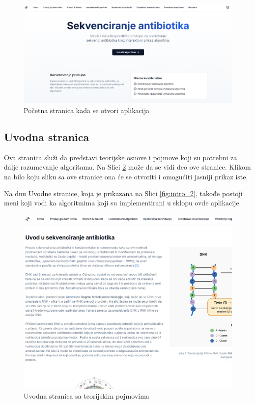 \documentclass[12pt,oneside]{memoir}
\begin{document}
\begin{figure}[H]
\centering
\includegraphics[width=1\textwidth]{images/landing_page.png}
\caption{Početna stranica kada se otvori aplikacija}
\label{fig:landing_page}
\end{figure}

\subsection{Uvodna stranica}

Ova stranica služi da predstavi teorijske osnove i pojmove koji su potrebni za dalje razumevanje algoritama. Na Slici \ref{fig:intro_1} može da se vidi deo ove stranice. Klikom na bilo koju sliku sa ove stranice ona će se otvoriti i omogućiti jasniji prikaz iste.

Na dnu Uvodne stranice, koja je prikazana na Slici \ref{fig:intro_2}, takođe postoji meni koji vodi ka algoritmima koji su implementirani u sklopu ovde aplikacije.

\begin{figure}[H]
\centering
\includegraphics[width=1\textwidth]{images/intro_1.png}
\caption{Uvodna stranica sa teorijskim pojmovima}
\label{fig:intro_1}
\end{figure}
\end{document}
